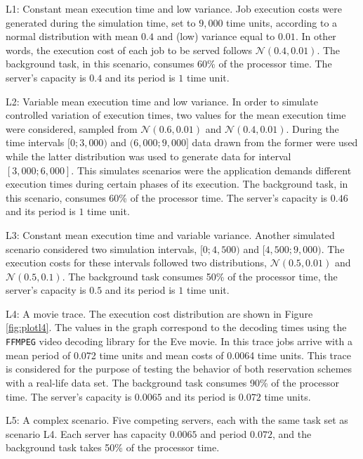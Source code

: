 \documentclass[12pt]{article}
\begin{document}
\begin{description}
\item L1: Constant mean execution time and low variance. Job execution
  costs were generated during the simulation time, set to $9,000$ time
  units, according to a normal distribution with mean $0.4$ and (low)
  variance equal to $0.01$. In other words, the execution cost of each
  job to be served follows $\mathcal{N}(0.4,0.01)$. The background
  task, in this scenario, consumes 60\% of the processor time. The
  server's capacity is $0.4$ and its period is $1$ time unit.
\item L2: Variable mean execution time and low variance.  In order to
  simulate controlled variation of execution times, two values for the
  mean execution time were considered, sampled from
  $\mathcal{N}(0.6,0.01)$ and $\mathcal{N}(0.4,0.01)$. During the time
  intervals $[0;3,000)$ and $(6,000;9,000]$ data drawn from the former
  were used while the latter distribution was used to generate data
  for interval $[3,000;6,000]$. This simulates scenarios were the
  application demands different execution times during certain phases
  of its execution. The background task, in this scenario, consumes
  60\% of the processor time. The server's capacity is $0.46$ and its
  period is $1$ time unit.
\item L3: Constant mean execution time and variable variance.  Another
  simulated scenario considered two simulation intervals, $[0;4,500)$
  and $[4,500;9,000)$.  The execution costs for these intervals
  followed two distributions, $\mathcal{N}(0.5,0.01)$ and
  $\mathcal{N}(0.5,0.1)$. The background task consumes 50\% of the
  processor time, the server's capacity is $0.5$ and its period is $1$
  time unit.
\item L4: A movie trace. The execution cost distribution are shown in
  Figure \ref{fig:plotl4}. The values in the graph correspond to the
  decoding times using the \texttt{FFMPEG} video decoding library for
  the Eve movie. In this trace jobs arrive with a mean period of 0.072
  time units and mean costs of 0.0064 time units. This trace is
  considered for the purpose of testing the behavior of both
  reservation schemes with a real-life data set. The background task
  consumes 90\% of the processor time. The server's capacity is
  $0.0065$ and its period is $0.072$ time units.
\item L5: A complex scenario. Five competing servers, each with the
  same task set as scenario L4. Each server has capacity $0.0065$ and
  period $0.072$, and the background task takes 50\% of the processor
  time.
\end{description}
\end{document}
